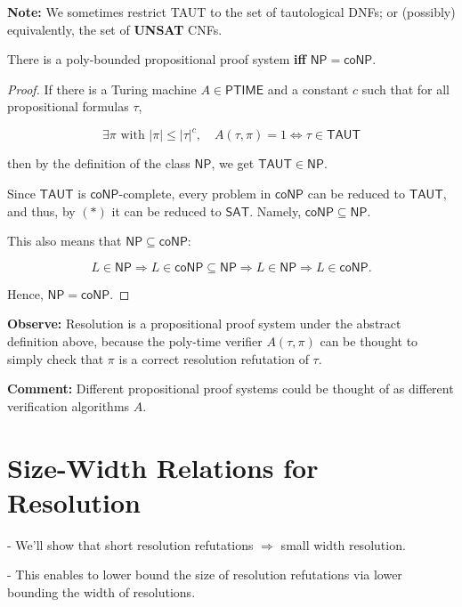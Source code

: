 \textbf{Note:} We sometimes restrict TAUT to the set of tautological DNFs; or (possibly) equivalently, the set of \textbf{UNSAT} CNFs.

\begin{theorem}
There is a poly-bounded propositional proof system \textbf{iff} $\mathsf{NP} = \mathsf{coNP}$.
\end{theorem}

\begin{proof}
If there is a Turing machine $A \in \mathsf{PTIME}$ and a constant $c$ such that for all propositional formulas $\tau$,

\[
\exists \pi \text{ with } |\pi| \leq |\tau|^c, \quad A(\tau, \pi) = 1 \iff \tau \in \mathsf{TAUT}
\]

then by the definition of the class $\mathsf{NP}$, we get $\mathsf{TAUT} \in \mathsf{NP}$.

Since $\mathsf{TAUT}$ is $\mathsf{coNP}$-complete, every problem in $\mathsf{coNP}$ can be reduced to $\mathsf{TAUT}$, and thus, by $(*)$ it can be reduced to $\mathsf{SAT}$. Namely, $\mathsf{coNP} \subseteq \mathsf{NP}$.

This also means that $\mathsf{NP} \subseteq \mathsf{coNP}$:

\[
L \in \mathsf{NP} \Rightarrow L \in \mathsf{coNP} \subseteq \mathsf{NP} \Rightarrow L \in \mathsf{NP} \Rightarrow L \in \mathsf{coNP}.
\]

Hence, $\mathsf{NP} = \mathsf{coNP}$.
\end{proof}



\textbf{Observe:} Resolution is a propositional proof system under the abstract definition above, because the poly-time verifier $A(\tau, \pi)$ can be thought to simply check that $\pi$ is a correct resolution refutation of $\tau$.

\textbf{Comment:} Different propositional proof systems could be thought of as different verification algorithms $A$.


\section{Size-Width Relations for Resolution}

- We'll show that short resolution refutations $\Rightarrow$ small width resolution.

- This enables to lower bound the size of resolution refutations via lower bounding the width of resolutions.

